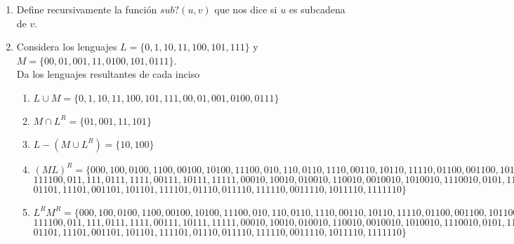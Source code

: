 \documentclass{article}
\begin{document}
\begin{enumerate}
{\begin{enumerate}
            \end{enumerate}
        }
        \item {
            Define recursivamente la función $sub?(u, v)$ que nos dice si $u$ 
            es subcadena de $v$.
        }
        \item {
            Considera los lenguajes $L = \{ 0, 1, 10, 11, 100, 101, 111 \}$ y 
            $M = \{ 00, 01, 001, 11, 0100, 101, 0111 \}$.\\
            Da los lenguajes resultantes de cada inciso
            \begin{enumerate}
                \item {
                    $L \cup M = \{0, 1, 10, 11, 100, 101, 111, 00, 01, 001, 0100, 0111 \}$ 
                }
                \item {
                    $M \cap L^R = \{01, 001, 11, 101 \}$
                }
                \item {
                    $L - (M \cup L^R) = \{10, 100 \}$
                }
                \item {
                    $(ML)^R = \{000, 100, 0100, 1100, 00100, 10100, 11100, 010, 110, 0110, 1110, 00110, 10110, 11110, 01100, 001100, 101100,$\\
                     $111100, 011, 111, 0111, 1111, 00111, 10111, 11111, 00010, 10010, 010010, 110010, 0010010, 1010010, 1110010, 0101, 1101,$\\
                      $01101, 11101, 001101, 101101, 111101, 01110, 011110, 111110, 0011110, 1011110, 1111110 \}$
                }
                \item {
                    $L^RM^R = \{000, 100, 0100, 1100, 00100, 10100, 11100, 010, 110, 0110, 1110, 00110, 10110, 11110, 01100, 001100, 101100,$\\
                     $111100, 011, 111, 0111, 1111, 00111, 10111, 11111, 00010, 10010, 010010, 110010, 0010010, 1010010, 1110010, 0101, 1101,$\\
                      $01101, 11101, 001101, 101101, 111101, 01110, 011110, 111110, 0011110, 1011110, 1111110 \}$
                                                                  
   }
            \end{enumerate}
        }
    \end{enumerate}
\end{document}
